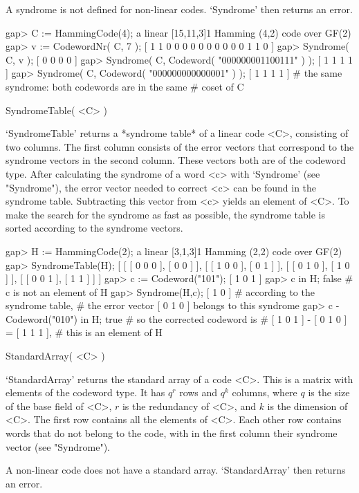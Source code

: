 A syndrome is not defined  for non-linear codes. `Syndrome' then  returns
an error.

\beginexample
gap> C := HammingCode(4);
a linear [15,11,3]1 Hamming (4,2) code over GF(2)
gap> v := CodewordNr( C, 7 );
[ 1 1 0 0 0 0 0 0 0 0 0 0 1 1 0 ]
gap> Syndrome( C, v );
[ 0 0 0 0 ]
gap> Syndrome( C, Codeword( "000000001100111" ) );
[ 1 1 1 1 ]
gap> Syndrome( C, Codeword( "000000000000001" ) );
[ 1 1 1 1 ]    # the same syndrome: both codewords are in the same
               # coset of C 
\endexample

\>SyndromeTable( <C> )

`SyndromeTable'  returns   a  *syndrome table* of   a    linear code <C>,
consisting of two columns. The first column consists of the error vectors
that correspond  to the  syndrome  vectors  in the  second column.  These
vectors both are of the codeword  type. After calculating the syndrome of
a word <c>  with `Syndrome' (see "Syndrome"), the  error vector needed to
correct  <c> can be found in  the syndrome table. Subtracting this vector
from <c> yields an element of <C>. To make the search for the syndrome as
fast as possible, the syndrome table  is sorted according to the syndrome
vectors.

\beginexample
gap> H := HammingCode(2);
a linear [3,1,3]1 Hamming (2,2) code over GF(2)
gap> SyndromeTable(H);
[ [ [ 0 0 0 ], [ 0 0 ] ], [ [ 1 0 0 ], [ 0 1 ] ],
  [ [ 0 1 0 ], [ 1 0 ] ], [ [ 0 0 1 ], [ 1 1 ] ] ]
gap> c := Codeword("101");
[ 1 0 1 ]
gap> c in H;
false          # c is not an element of H
gap> Syndrome(H,c);
[ 1 0 ]        # according to the syndrome table,
               # the error vector [ 0 1 0 ] belongs to this syndrome
gap> c - Codeword("010") in H;
true           # so the corrected codeword is
               # [ 1 0 1 ] - [ 0 1 0 ] = [ 1 1 1 ],
               # this is an element of H 
\endexample

\>StandardArray( <C> )

`StandardArray'  returns the standard  array of   a  code <C>. This  is a
matrix  with elements of  the codeword type. It has  $q^r$ rows and $q^k$
columns,  where $q$ is  the size  of the base  field  of <C>, $r$  is the
redundancy   of <C>, and $k$    is the dimension   of <C>.  The first row
contains all the elements of <C>.  Each other row  contains words that do
not belong to  the code, with  in the first  column their syndrome vector
(see "Syndrome").

A non-linear code does  not have a  standard array.  `StandardArray' then
returns an error.

